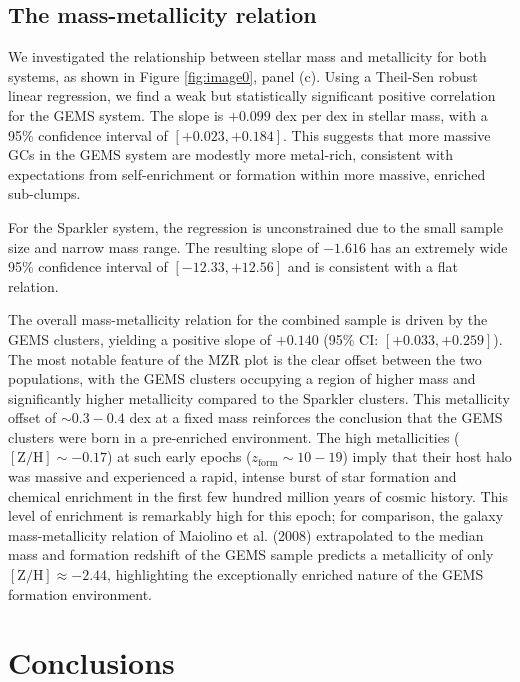 \documentclass[]{article}
\begin{document}
\subsection{The mass-metallicity relation}

We investigated the relationship between stellar mass and metallicity for both systems, as shown in Figure \ref{fig:image0}, panel (c). Using a Theil-Sen robust linear regression, we find a weak but statistically significant positive correlation for the GEMS system. The slope is $+0.099$ dex per dex in stellar mass, with a 95\% confidence interval of $[+0.023, +0.184]$. This suggests that more massive GCs in the GEMS system are modestly more metal-rich, consistent with expectations from self-enrichment or formation within more massive, enriched sub-clumps.

For the Sparkler system, the regression is unconstrained due to the small sample size and narrow mass range. The resulting slope of $-1.616$ has an extremely wide 95\% confidence interval of $[-12.33, +12.56]$ and is consistent with a flat relation.

The overall mass-metallicity relation for the combined sample is driven by the GEMS clusters, yielding a positive slope of $+0.140$ (95\% CI: $[+0.033, +0.259]$). The most notable feature of the MZR plot is the clear offset between the two populations, with the GEMS clusters occupying a region of higher mass and significantly higher metallicity compared to the Sparkler clusters. This metallicity offset of $\sim 0.3-0.4$ dex at a fixed mass reinforces the conclusion that the GEMS clusters were born in a pre-enriched environment. The high metallicities ($[\mathrm{Z/H}] \sim -0.17$) at such early epochs ($z_\mathrm{form} \sim 10-19$) imply that their host halo was massive and experienced a rapid, intense burst of star formation and chemical enrichment in the first few hundred million years of cosmic history. This level of enrichment is remarkably high for this epoch; for comparison, the galaxy mass-metallicity relation of Maiolino et al. (2008) extrapolated to the median mass and formation redshift of the GEMS sample predicts a metallicity of only $[\mathrm{Z/H}] \approx -2.44$, highlighting the exceptionally enriched nature of the GEMS formation environment.

\section{Conclusions}
\label{sec:conclusions}
\end{document}
